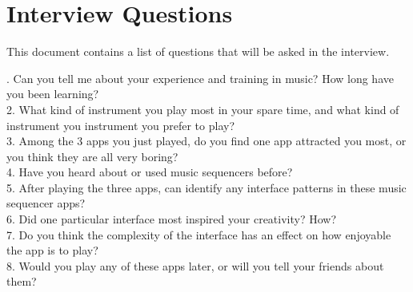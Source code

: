 \chapter{Interview Questions}
\label{app: AppendixC}

This document contains a list of questions that will be asked in the interview.

{. Can you tell me about your experience and training in music? How long have you been learning? \\

2. What kind of instrument you play most in your spare time, and what kind of instrument you instrument you prefer to play? \\

3. Among the 3 apps you just played, do you find one app attracted you most, or you think they are all very boring? \\

4. Have you heard about or used music sequencers before? \\

5. After playing the three apps, can identify any interface patterns in these music sequencer apps? \\

6. Did one particular interface most inspired your creativity? How? \\

7. Do you think the complexity of the interface has an effect on how enjoyable the app is to play? \\

8. Would you play any of these apps later, or will you tell your friends about them? \\
}
\clearpage
